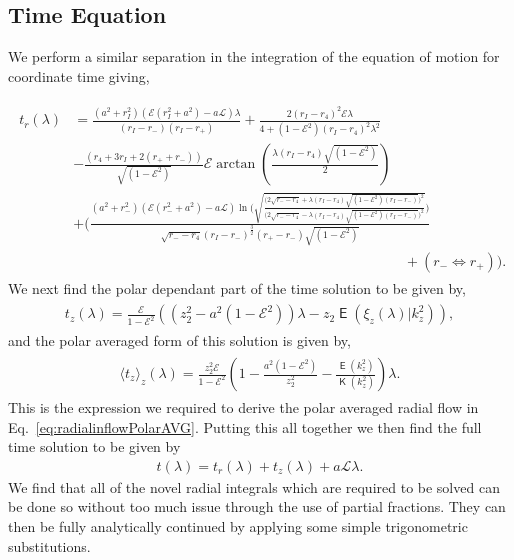 \documentclass[12pt, amsmath]{revtex4-2}
\newcommand\lam{\lambda}
\newcommand\EN{\mathcal{E}}
\newcommand\ANG{\mathcal{L}}
\newcommand{\elK}{\operatorname{\mathsf{K}}}%
\newcommand{\elE}{\operatorname{\mathsf{E}}}%
\begin{document}
\subsection{Time Equation}
We perform a similar separation in the integration of the equation of motion for coordinate time giving,

\begin{align}
\begin{aligned}
    t_r(\lam) &= \frac{(a^2+r_I^2)(\EN(r_I^2+ a^2) - a \ANG)\lam }{(r_I-r_{-})(r_I-r_{+})}+ \frac{2(r_I - r_4)^2\EN \lam}{4 + (1-\EN^2)(r_I-r_4)^2\lam^2}\\
    &- \frac{(r_4+3r_I + 2(r_{+}+r_{-}))}{\sqrt{(1-\EN^2)}}\EN\arctan \left( \frac{\lam (r_I-r_4)\sqrt{(1-\EN^2)}}{2}\right)\\
    &+ \Biggl( \frac{(a^2+r_{-}^2)(\EN(r_{-}^2+ a^2) - a \ANG)  \ln\bigg({\sqrt{\frac{\big(2\sqrt{r_{-}-r_4}+\lam(r_I-r_4)\sqrt{(1-\EN^2)(r_I-r_-)}\big)^2}{\big(2\sqrt{r_{-}-r_4}-\lam(r_I-r_4)\sqrt{(1-\EN^2)(r_I-r_-)}\big)^2}}}\bigg)}{\sqrt{r_{-}-r_4}(r_I-r_{-})^{\frac{3}{2}}(r_{+}-r_{-})\sqrt{(1-\EN^2)}} \\
    &\;\;\;\;\;\;\;\;\;\;\;\;\;\;\;\;\;\;\;\;\;\;\;\;\;\;\;\;\;\;\;\;\;\;\;\;\;\;\;\;\;\;\;\;\;\;\;\;\;\;\;\;\;\;\;\;\;\;\;\;\;\;\;\;\;\;\;\;\;\;\;\;\;\;\;\;\;\;\;\;\;\;\;\;\;+ (r_{-} \Longleftrightarrow r_{+}) \Biggl).
\end{aligned}
\end{align}
We next find the polar dependant part of the time solution to be given by,
\begin{align}
    \begin{aligned}
    t_z(\lam)  = \frac{ \EN}{1-\EN^2}\left( (z_2^2 - a^2(1-\EN^2))\lam - z_2\elE(\xi_z(\lam)|k_z^2) \right),
    \end{aligned}
\end{align}
and the polar averaged form of this solution is given by, 
\begin{align}
    \begin{aligned}
   \langle t_z\rangle_z (\lam)  = \frac{z_2^2 \EN}{1-\EN^2}\left( 1 - \frac{a^2(1-\EN^2)}{z_2^2} - \frac{\elE( k_z^2)}{ \elK(k_z^2)} \right)\lam.
    \end{aligned}
\end{align}
This is the expression we required to derive the polar averaged radial flow in Eq.~\eqref{eq:radialinflowPolarAVG}.
Putting this all together we then find the full time solution to be given by 
\begin{align}
    t(\lam) = t_r(\lam) +   t_z(\lam) + a \ANG \lam.
\end{align}
We find that all of the novel radial integrals which are required to be solved can be done so without too much issue through the use of partial fractions. They can then be fully analytically continued by applying some simple trigonometric substitutions.
\end{document}
